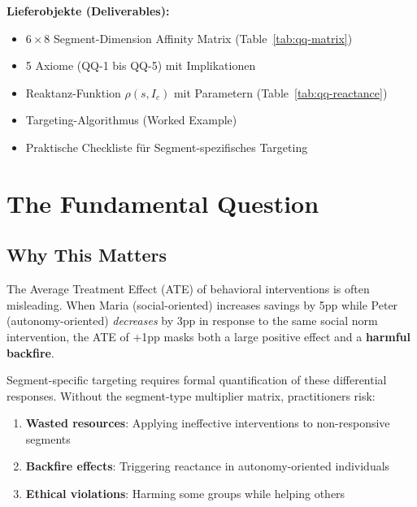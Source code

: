 \begin{tcolorbox}[
    colback=orange!5!white,
    colframe=orange!75!black,
    title={\textbf{Appendix Scope: Ziel / In-Scope / Out-of-Scope / Constraints}},
    fonttitle=\bfseries
]
\textbf{Lieferobjekte (Deliverables):}
\begin{itemize}[nosep]
    \item $6 \times 8$ Segment-Dimension Affinity Matrix (Table~\ref{tab:qq-matrix})
    \item 5 Axiome (QQ-1 bis QQ-5) mit Implikationen
    \item Reaktanz-Funktion $\rho(s, I_c)$ mit Parametern (Table~\ref{tab:qq-reactance})
    \item Targeting-Algorithmus (Worked Example)
    \item Praktische Checkliste für Segment-spezifisches Targeting
\end{itemize}

\end{tcolorbox}



\section{The Fundamental Question}
\label{sec:qq-fundamental}

\subsection{Why This Matters}

The Average Treatment Effect (ATE) of behavioral interventions is often misleading.
When Maria (social-oriented) increases savings by 5pp while Peter (autonomy-oriented)
\textit{decreases} by 3pp in response to the same social norm intervention, the
ATE of +1pp masks both a large positive effect and a \textbf{harmful backfire}.

Segment-specific targeting requires formal quantification of these differential
responses. Without the segment-type multiplier matrix, practitioners risk:
\begin{enumerate}
\item \textbf{Wasted resources}: Applying ineffective interventions to non-responsive segments
\item \textbf{Backfire effects}: Triggering reactance in autonomy-oriented individuals
\item \textbf{Ethical violations}: Harming some groups while helping others
\end{enumerate}

